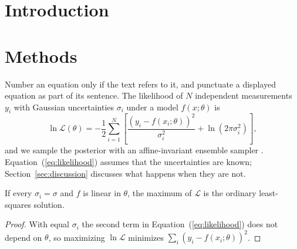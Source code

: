 
\section{Introduction}
\label{sec:intro}


\section{Methods}
\label{sec:methods}


Number an equation only if the text refers to it, and punctuate a displayed equation as part of its sentence. The likelihood of $N$ independent measurements $y_i$ with Gaussian uncertainties $\sigma_i$ under a model $f(x;\theta)$ is
\begin{equation}
\ln \mathcal{L}(\theta) = -\frac{1}{2} \sum_{i=1}^{N} \left[ \frac{\left(y_i - f(x_i;\theta)\right)^2}{\sigma_i^2} + \ln\left(2\pi\sigma_i^2\right) \right],
\label{eq:likelihood}
\end{equation}
and we sample the posterior with an affine-invariant ensemble sampler \citep{Goodman2010, ForemanMackey2013}. Equation~(\ref{eq:likelihood}) assumes that the uncertainties are known; Section~\ref{sec:discussion} discusses what happens when they are not.

\begin{proposition}
\label{prop:example}
If every $\sigma_i = \sigma$ and $f$ is linear in $\theta$, the maximum of $\mathcal{L}$ is the ordinary least-squares solution.
\end{proposition}

\begin{proof}
With equal $\sigma_i$ the second term in Equation~(\ref{eq:likelihood}) does not depend on $\theta$, so maximizing $\ln\mathcal{L}$ minimizes $\sum_i (y_i - f(x_i;\theta))^2$.
\end{proof}

